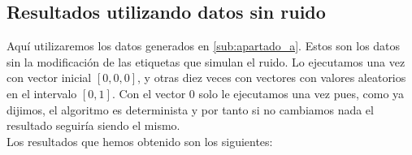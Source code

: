 \documentclass[
  a4paper,
  spanish,
  12pt,
  enlargefirstpage,
]{scrartcl}
\begin{document}
\subsection{Resultados utilizando datos sin ruido}%
\label{sub:resultados_utilizando_datos_sin_ruido}
Aquí utilizaremos los datos generados en \ref{sub:apartado_a}. Estos son los datos sin la modificación de las etiquetas que simulan el ruido. Lo ejecutamos una vez con vector inicial \([0,0,0]\), y otras diez veces con vectores con valores aleatorios en el intervalo \([0,1]\). Con el vector \(0\) solo le ejecutamos una vez pues, como ya dijimos, el algoritmo es determinista y por tanto si no cambiamos nada el resultado seguiría siendo el mismo.\\

Los resultados que hemos obtenido son los siguientes:
\end{document}
